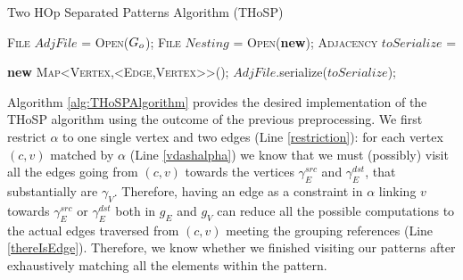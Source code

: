 \begin{algorithm}[!t]
	\caption{Two HOp Separated Patterns Algorithm (THoSP)}\label{alg:THoSPAlgorithm}
	\begin{adjustbox}{max width=\textwidth}
		\begin{minipage}{1.2\linewidth}
			\algrenewcommand\algorithmicindent{1em}
			\begin{algorithmic}[1]
				\State \textsc{File} $AdjFile$ = \textsc{Open}($G_o$);
				\State \textsc{File} $Nesting$ = \textsc{Open}(\textbf{new});
				\State \textsc{Adjacency} $toSerialize$ = \par \textbf{new} \textsc{Map<Vertex,<Edge,Vertex>>}();
				\label{restriction}
				\label{vdashalpha}
				 \label{substantiallyIs}
				 \label{substantiallyIs2}
				\label{thereIsEdge}
				\EndIf
				\EndFor
				\EndFor
				\EndIf
				\EndFor
				$AdjFile$.serialize($toSerialize$);
				
				\EndProcedure
			\end{algorithmic}
		\end{minipage}
	\end{adjustbox}
\end{algorithm}
Algorithm \ref{alg:THoSPAlgorithm} provides the desired implementation of the THoSP algorithm using the outcome of the previous preprocessing. We first restrict $\alpha$ to one single vertex and two edges (Line \ref{restriction}): for each vertex $(c,v)$ matched by $\alpha$ (Line \ref{vdashalpha}) we know that we must (possibly) visit all the edges going from $(c,v)$ towards the vertices $\gamma_E^{src}$ and $\gamma_E^{dst}$, that substantially are $\gamma_V$.  Therefore, having an edge as a constraint in $\alpha$ linking $v$ towards $\gamma_E^{src}$ or $\gamma_E^{dst}$ both in $g_E$ and $g_V$ can reduce all the possible computations to the actual edges traversed from $(c,v)$ meeting the grouping references (Line \ref{thereIsEdge}). Therefore, we know whether we finished visiting our patterns after exhaustively matching all the elements within the pattern.
